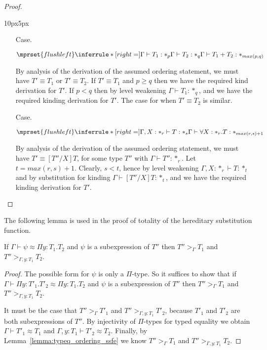 \begin{proof}
\begin{changemargin}{10px}{5px}
\begin{itemize}
\item[Case.]\ \\
  \begin{center}
    \begin{math}
      $$\mprset{flushleft}
      \inferrule* [right=] {
        \Gamma \vdash T_1 : *_p
	\\
	\Gamma \vdash T_2 : *_q
      }{\Gamma \vdash T_1 + T_2 : *_{max(p,q)}}
    \end{math}
  \end{center}
  By analysis of the derivation of the assumed ordering statement, we must have 
  $T' \equiv T_1$ or $T' \equiv T_2$.  If $T' \equiv T_1$ and 
  $p \geq q$ then we have the required kind derivation for $T'$. If $p < q$ then by 
  level weakening $\Gamma \vdash T_1:*_q$, and we have the required kinding 
  derivation for $T'$.  The case for when $T' \equiv T_2$ is similar.\\
  
\item[Case.]\ \\
  \begin{center}
    \begin{math}
      $$\mprset{flushleft}
      \inferrule* [right=] {
        \Gamma,X : *_r \vdash T : *_s
      }{\Gamma \vdash \forall X:*_r.T : *_{max(r,s)+1}}
    \end{math}
  \end{center}
  By analysis of the derivation of the assumed ordering statement, we must have 
  $T' \equiv [T''/X]T$, for some type $T''$ with 
  $\Gamma \vdash T'':*_r$.  Let $t = max(r,s) + 1$. Clearly, 
  $s < t$, hence by level weakening $\Gamma,X:*_r \vdash T:*_t$ and by substitution 
  for kinding $\Gamma \vdash [T''/X]T:*_t$, and we have the required kinding 
  derivation for $T'$.  
\end{itemize}
\end{changemargin}
\end{proof}
The following lemma is used in the proof of totality of the hereditary substitution function.
\begin{lemma}
  \label{lemma:A_prop_ssfe}
  If $\Gamma \vdash \psi \approx \Pi y:T_1.T_2$ and $\psi$ is a subexpression of $T''$ then
  $T'' >_\Gamma T_1$ and $T'' >_{\Gamma,y:T_1} T_2$.
\end{lemma}
\begin{proof}
  The possible form for $\psi$ is only a $\Pi$-type.  So it suffices to show that
  if $\Gamma \vdash \Pi y:T'_1.T'_2 \approx \Pi y:T_1.T_2$ and $\psi$ is
  a subexpression of $T''$ then $T'' >_\Gamma T_1$ and $T'' >_{\Gamma,y:T_1} T_2$.

  It must be the case that $T'' >_\Gamma T'_1$ and $T'' >_{\Gamma,y:T_1} T'_2$, because
  $T'_1$ and $T'_2$ are both subexpressions of $T''$.  By injectivity of $\Pi$-types
  for typed equality we obtain $\Gamma \vdash T'_1 \approx T_1$ and $\Gamma,y:T_1 \vdash T'_2 \approx T_2$.
  Finally, by Lemma~\ref{lemma:typeq_ordering_ssfe} we know $T'' >_\Gamma T_1$ and $T'' >_{\Gamma,y:T_1} T_2$.
\end{proof}

